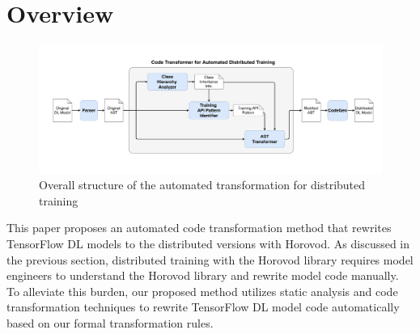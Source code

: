 \section{Overview}
 
\begin{figure}[ht!]
  \centering
  \includegraphics[width=\textwidth]{overview_diagram.pdf}
  \caption{Overall structure of the 
  automated transformation for distributed training}
  \label{sysarch}
\end{figure}


\noindent
This paper proposes an automated code transformation method that rewrites
TensorFlow DL models to the distributed versions with Horovod.
As discussed in the previous section, distributed training with the Horovod
library requires model engineers to understand the Horovod library and rewrite
model code manually.
To alleviate this burden, our proposed method utilizes static analysis and code
transformation techniques to rewrite TensorFlow DL model code automatically
based on our formal transformation rules.


